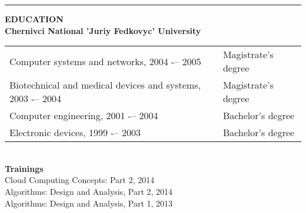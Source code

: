 \documentclass{article}
\begin{document}
{\color{lightgray}\hrule height 0.2mm} \vspace{2mm}
\noindent
\textbf{EDUCATION}\\
\textbf{Chernivci National 'Juriy Fedkovyc' University}\\
\noindent\begin{tabular}{@{}ll}
  Computer systems and networks, 2004 -– 2005                & Magistrate's degree \\
  Biotechnical and medical devices and systems, 2003 -– 2004 & Magistrate's degree \\
  Computer engineering, 2001 -– 2004                         & Bachelor's degree   \\
  Electronic devices, 1999 -– 2003                           & Bachelor's degree   \\
\end{tabular}\\
\noindent
\textbf{Trainings}\\
  Cloud Computing Concepts: Part 2, 2014 \\
  Algorithms: Design and Analysis, Part 2, 2014 \\
  Algorithms: Design and Analysis, Part 1, 2013 \\
\end{document}
